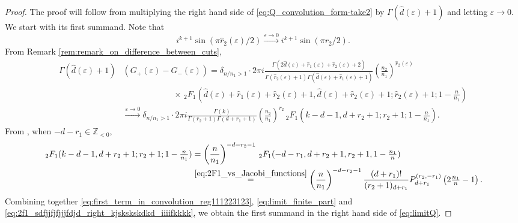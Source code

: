 \documentclass[]{article}
\begin{document}
\begin{proof}
The proof will follow from multiplying the right hand side of \eqref{eq:Q_convolution_form-take2} by $\Gamma(\hat d(\varepsilon) +1   )$ and letting $\varepsilon \to 0$. 
We start with its first summand. Note that 
\begin{equation}\label{eq:first_term_in_convolution_reg111223123}
    i^{k+1} \sin( \pi \hat r_2(\varepsilon) / 2)  \stackrel{  \varepsilon \to 0  }{\to } i^{k+1} \sin( \pi r_2 / 2).
\end{equation}
From Remark \ref{rem:remark_on_difference_between_cuts}, 
    \begin{equation}\label{eq:limit_finite_part}
    \begin{split}
     \Gamma(\hat d(\varepsilon)+1 )   &\left(   G_+(\varepsilon)  - G_-(\varepsilon) \right)   
     =  \delta_{ n/n_1 > 1 } \cdot 2  \pi i   \frac{  \Gamma(2 \hat d(\varepsilon)+\hat r_1(\varepsilon)+\hat r_2(\varepsilon)+2)  }{\Gamma(\hat r_2(\varepsilon)+1)\Gamma (\hat d(\varepsilon)+\hat r_1(\varepsilon)+1)}   (\tfrac{n_2}{n_1})^{\hat r_2 (\varepsilon)} \\
     &  \ \ \ \ \ \ \ \ \ \ \ \ \ \ \ \ \ \ \ \ \ \ \ \ \ \ \ \times\, _2F_1( \hat d(\varepsilon)+\hat r_1(\varepsilon)+\hat r_2(\varepsilon)+1,\hat d(\varepsilon)+\hat r_2(\varepsilon)+1;\hat r_2(\varepsilon)+1;1-\tfrac{n}{n_1}) \\ 
  & \stackrel{\varepsilon \to 0}{\to}  \delta_{ n/n_1 > 1 } \cdot  2  \pi i   \frac{  \Gamma(k) }{\Gamma(r_2+1)\Gamma (d+r_1+1)}  (\tfrac{n_2}{n_1})^{r_2} \, _2F_1(k-d-1,d+r_2+1;r_2+1;1-\tfrac{n}{n_1}) .
    \end{split}
    \end{equation}
From \cite[15.8.1]{NIST}, when $-d-r_1\in\mathbb{Z}_{<0}$,
\begin{equation}\label{eq:2f1_sdfjjfjfjjjfdjd_right_kjskskskdkd_iiiifkkkk}
    \begin{split}
     \, _2F_1(k-d-1,d+r_2+1;r_2+1;1-\tfrac{n}{n_1})&  =  \left(\frac{n}{n_1}\right)^{-d-r_2-1} \, _2 F_1(  -d-r_1, d+r_2+1, r_2+1, 1-\tfrac{n_1}{n}) \\
&   \stackrel{\eqref{eq:2F1_vs_Jacobi_functions}}{=}  \left(\frac{n}{n_1}\right)^{-d-r_2-1}  \frac{(d+r_1)! }{(r_2+1)_{d+r_1}} P_{d+r_1}^{(r_2,-r_1)}\left(2\tfrac{n_1}{n}-1\right).
\end{split}
\end{equation}
Combining together \eqref{eq:first_term_in_convolution_reg111223123}, \eqref{eq:limit_finite_part} and \eqref{eq:2f1_sdfjjfjfjjjfdjd_right_kjskskskdkd_iiiifkkkk}, we obtain the first summand in the right hand side of \eqref{eq:limitQ}.




\end{proof}
\end{document}
